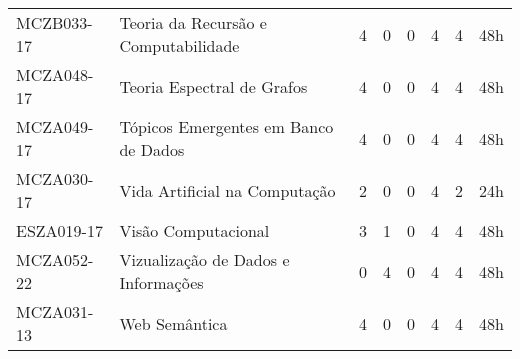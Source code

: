 \documentclass[a4paper]{article}
\begin{document}
\begin{longtable}{|l|l|llll|l|l|}
MCZB033-17 & Teoria da Recursão e Computabilidade & 4 & 0 & 0 & 4 & 4 & 48h \\
MCZA048-17 & Teoria Espectral de Grafos & 4 & 0 & 0 & 4 & 4 & 48h \\
MCZA049-17 & Tópicos Emergentes em Banco de Dados & 4 & 0 & 0 & 4 & 4 & 48h \\
MCZA030-17 & Vida Artificial na Computação & 2 & 0 & 0 & 4 & 2 & 24h \\
ESZA019-17 & Visão Computacional & 3 & 1 & 0 & 4 & 4 & 48h \\
MCZA052-22 & Vizualização de Dados e Informações & 0 & 4 & 0 & 4 & 4 & 48h \\
MCZA031-13 & Web Semântica & 4 & 0 & 0 & 4 & 4 & 48h \\
\end{longtable}
\end{document}
